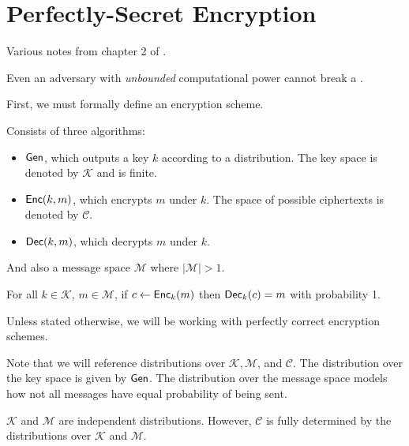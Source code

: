 \section{Perfectly-Secret Encryption}
\label{perfectly-secret}

Various notes from chapter 2 of \cite{katz-lindell}.

\begin{definition}
    Even an adversary with \textit{unbounded} computational power cannot break a .
\end{definition}

First, we must formally define an encryption scheme.
\begin{definition}
    Consists of three algorithms:
    \begin{itemize}
        \item $\operatorname{\mathsf{Gen}}$, which outputs a key $k$ according to a distribution. The key space is denoted by $\mathcal{K}$ and is finite.
        \item $\operatorname{\mathsf{Enc}}(k, m)$, which encrypts $m$ under $k$. The space of possible ciphertexts is denoted by $\mathcal{C}$.
        \item $\operatorname{\mathsf{Dec}}(k, m)$, which decrypts $m$ under $k$.
    \end{itemize}
    And also a message space $\mathcal{M}$ where $|\mathcal{M}| > 1$.
\end{definition}

\begin{definition}
    For all $k \in \mathcal{K}$, $m \in \mathcal{M}$, if $c \leftarrow \operatorname{\mathsf{Enc}}_k(m)$ then $\operatorname{\mathsf{Dec}}_k(c) = m$ with probability 1.        

    Unless stated otherwise, we will be working with perfectly correct encryption schemes.
\end{definition}

Note that we will reference distributions over $\mathcal{K}, \mathcal{M}$, and $\mathcal{C}$. The distribution over the key space is given by $\operatorname{\mathsf{Gen}}$. The distribution over the message space models how not all messages have equal probability of being sent.

$\mathcal{K}$ and $\mathcal{M}$ are independent distributions. However, $\mathcal{C}$ is fully determined by the distributions over $\mathcal{K}$ and $\mathcal{M}$.


